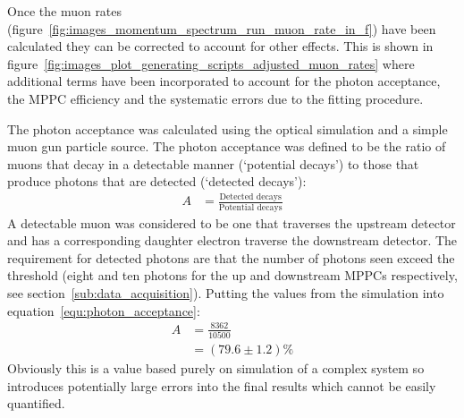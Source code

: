 

\clearpage
Once the muon rates (figure~\ref{fig:images_momentum_spectrum_run_muon_rate_in_f}) have been calculated they can be corrected to account for other effects. This is shown in figure~\ref{fig:images_plot_generating_scripts_adjusted_muon_rates} where additional terms have been incorporated to account for the photon acceptance, the MPPC efficiency and the systematic errors due to the fitting procedure. 

The photon acceptance was calculated using the optical simulation and a simple muon gun particle source. The photon acceptance was defined to be the ratio of muons that decay in a detectable manner (`potential decays') to those that produce photons that are detected (`detected decays'):
\begin{align}
  A &= \frac{\text{Detected decays}}{\text{Potential decays}} \label{equ:photon_acceptance}
\end{align}
A detectable muon was considered to be one that traverses the upstream detector and has a corresponding daughter electron traverse the downstream detector. The requirement for detected photons are that the number of photons seen exceed the threshold (eight and ten photons for the up and downstream MPPCs respectively, see section~\ref{sub:data_acquisition}). Putting the values from the simulation into equation~\eqref{equ:photon_acceptance}:
\begin{align}
  A &= \frac{8362}{10500} \\
    &= (79.6\pm1.2)\%
\end{align}
Obviously this is a value based purely on simulation of a complex system so introduces potentially large errors into the final results which cannot be easily quantified.

